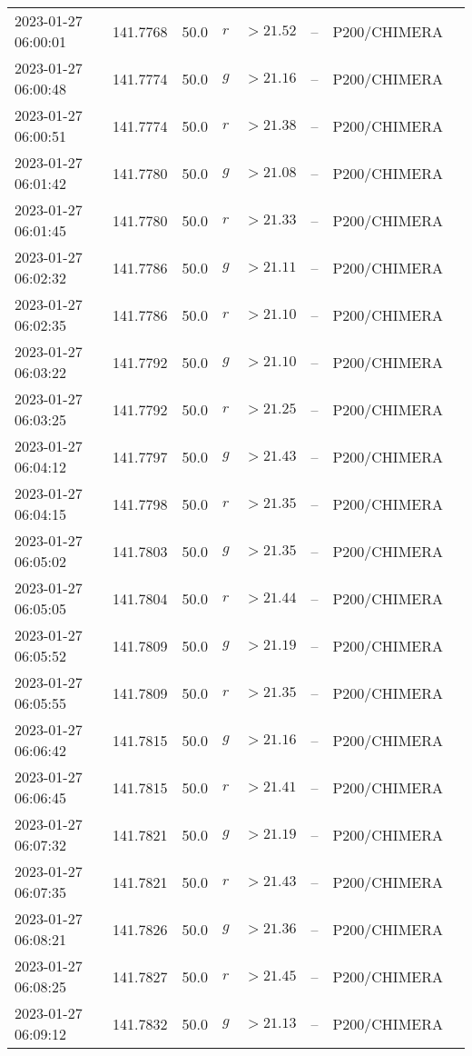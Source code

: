 \documentclass{nature_plusfigure}
\begin{document}
\begin{supplement}
\begin{center}
\begin{longtable}{llllllll}
2023-01-27 06:00:01 & 141.7768 & 50.0 & $r$ & $>21.52$ & -- & P200/CHIMERA &  \\ 
2023-01-27 06:00:48 & 141.7774 & 50.0 & $g$ & $>21.16$ & -- & P200/CHIMERA &  \\ 
2023-01-27 06:00:51 & 141.7774 & 50.0 & $r$ & $>21.38$ & -- & P200/CHIMERA &  \\ 
2023-01-27 06:01:42 & 141.7780 & 50.0 & $g$ & $>21.08$ & -- & P200/CHIMERA &  \\ 
2023-01-27 06:01:45 & 141.7780 & 50.0 & $r$ & $>21.33$ & -- & P200/CHIMERA &  \\ 
2023-01-27 06:02:32 & 141.7786 & 50.0 & $g$ & $>21.11$ & -- & P200/CHIMERA &  \\ 
2023-01-27 06:02:35 & 141.7786 & 50.0 & $r$ & $>21.10$ & -- & P200/CHIMERA &  \\ 
2023-01-27 06:03:22 & 141.7792 & 50.0 & $g$ & $>21.10$ & -- & P200/CHIMERA &  \\ 
2023-01-27 06:03:25 & 141.7792 & 50.0 & $r$ & $>21.25$ & -- & P200/CHIMERA &  \\ 
2023-01-27 06:04:12 & 141.7797 & 50.0 & $g$ & $>21.43$ & -- & P200/CHIMERA &  \\ 
2023-01-27 06:04:15 & 141.7798 & 50.0 & $r$ & $>21.35$ & -- & P200/CHIMERA &  \\ 
2023-01-27 06:05:02 & 141.7803 & 50.0 & $g$ & $>21.35$ & -- & P200/CHIMERA &  \\ 
2023-01-27 06:05:05 & 141.7804 & 50.0 & $r$ & $>21.44$ & -- & P200/CHIMERA &  \\ 
2023-01-27 06:05:52 & 141.7809 & 50.0 & $g$ & $>21.19$ & -- & P200/CHIMERA &  \\ 
2023-01-27 06:05:55 & 141.7809 & 50.0 & $r$ & $>21.35$ & -- & P200/CHIMERA &  \\ 
2023-01-27 06:06:42 & 141.7815 & 50.0 & $g$ & $>21.16$ & -- & P200/CHIMERA &  \\ 
2023-01-27 06:06:45 & 141.7815 & 50.0 & $r$ & $>21.41$ & -- & P200/CHIMERA &  \\ 
2023-01-27 06:07:32 & 141.7821 & 50.0 & $g$ & $>21.19$ & -- & P200/CHIMERA &  \\ 
2023-01-27 06:07:35 & 141.7821 & 50.0 & $r$ & $>21.43$ & -- & P200/CHIMERA &  \\ 
2023-01-27 06:08:21 & 141.7826 & 50.0 & $g$ & $>21.36$ & -- & P200/CHIMERA &  \\ 
2023-01-27 06:08:25 & 141.7827 & 50.0 & $r$ & $>21.45$ & -- & P200/CHIMERA &  \\ 
2023-01-27 06:09:12 & 141.7832 & 50.0 & $g$ & $>21.13$ & -- & P200/CHIMERA &  \\ 

\end{longtable}
\end{center}
\end{supplement}
\end{document}
